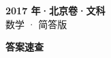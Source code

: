 \documentclass[zihao=-4, a4paper]{ctexart}
\begin{document}
\begin{center}
  {\Large\bfseries 2017 年·北京卷·文科}\\[4pt]
  {\large 数学 · 简答版}
\end{center}
\medskip
{}

\clearpage
{}
\begin{center}{\Large\bfseries 答案速查}\end{center}
\medskip

\end{document}

